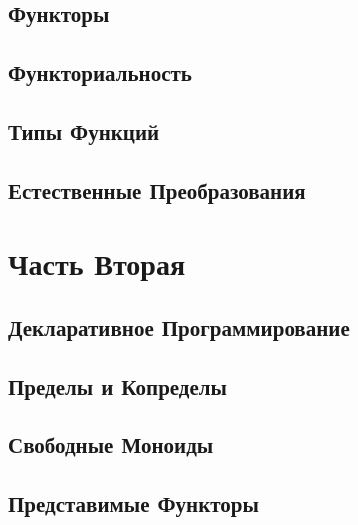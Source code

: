 \chapter{Функторы}\label{functors}


\chapter{Функториальность}\label{functoriality}


\chapter{Типы Функций}\label{function-types}


\chapter{Естественные Преобразования}\label{natural-transformations}


\part*{Часть Вторая}

\chapter{Декларативное Программирование}\label{declarative-programming}


\chapter{Пределы и Копределы}\label{limits-and-colimits}


\chapter{Свободные Моноиды}\label{free-monoids}


\chapter{Представимые Функторы}\label{representable-functors}


